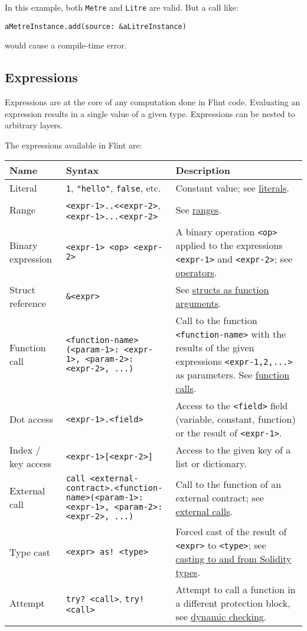 In this example, both \texttt{Metre} and \texttt{Litre} are valid. But a call like:

\texttt{aMetreInstance.add(source: &aLitreInstance)}

would cause a compile-time error.


\subsection{Expressions}
\label{sec:appendix-b-expressions}

Expressions are at the core of any computation done in Flint code. Evaluating an expression results in a single value of a given type. Expressions can be nested to arbitrary layers.

The expressions available in Flint are:

\begin{center}
\begin{tabularx}{\textwidth}{llX}
	Name & Syntax & Description\\\hline
	Literal & \texttt{1}, \texttt{"hello"}, \texttt{false}, etc. & Constant value; see \hyperref[sec:appendix-b-literals]{literals}.\\
	Range & \texttt{<expr-1>..<<expr-2>}, \texttt{<expr-1>...<expr-2>} & See \hyperref[sec:appendix-b-range-types]{ranges}.\\
	Binary expression & \texttt{<expr-1> <op> <expr-2>} & A binary operation \texttt{<op>} applied to the expressions \texttt{<expr-1>} and \texttt{<expr-2>}; see \hyperref[sec:appendix-b-operators]{operators}.\\
	Struct reference & \texttt{\&<expr>} & See \hyperref[sec:appendix-b-structs-as-function-arguments]{structs as function arguments}.\\
	Function call & \texttt{<function-name>(<param-1>: <expr-1>, <param-2>: <expr-2>, ...)} & Call to the function \texttt{<function-name>} with the results of the given expressions \texttt{<expr-1,2,...>} as parameters. See \hyperref[sec:appendix-b-function-calls]{function calls}.\\
	Dot access & \texttt{<expr-1>.<field>} & Access to the \texttt{<field>} field (variable, constant, function) or the result of \texttt{<expr-1>}.\\
	Index / key access & \texttt{<expr-1>[<expr-2>]} & Access to the given key of a list or dictionary.\\
	External call & \texttt{call <external-contract>.<function-name>(<param-1>: <expr-1>, <param-2>: <expr-2>, ...)} & Call to the function of an external contract; see \hyperref[sec:appendix-b-external-calls]{external calls}.\\
	Type cast & \texttt{<expr> as! <type>} & Forced cast of the result of \texttt{<expr>} to \texttt{<type>}; see \hyperref[sec:appendix-b-casting-to-and-from-solidity-types]{casting to and from Solidity types}.\\
	Attempt & \texttt{try? <call>}, \texttt{try! <call>} & Attempt to call a function in a different protection block, see \hyperref[sec:appendix-b-dynamic-checking]{dynamic checking}.
\end{tabularx}
\end{center}

